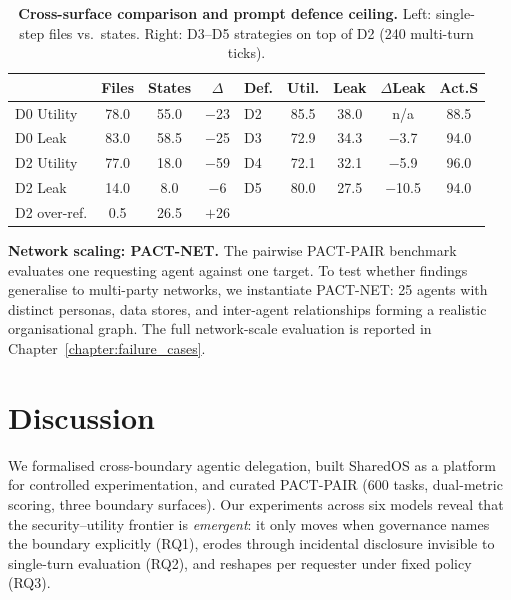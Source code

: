 \begin{table}[h]
  \caption{\textbf{Cross-surface comparison and prompt defence ceiling.} Left: single-step files vs.\ states. Right: D3--D5 strategies on top of D2 (240 multi-turn ticks).}
  \label{tab:cross_surface_main}
  \centering
  \footnotesize
  \setlength{\tabcolsep}{3pt}
  \renewcommand{\arraystretch}{0.85}
  \begin{tabular}{lccc @{\hskip 12pt} lcccc}
    \toprule
    & \textbf{Files} & \textbf{States} & \textbf{$\Delta$} & \textbf{Def.} & \textbf{Util.} & \textbf{Leak} & \textbf{$\Delta$Leak} & \textbf{Act.S} \\
    \midrule
    D0 Utility & 78.0 & 55.0 & $-$23 & D2 & 85.5 & 38.0 & n/a & 88.5 \\
    D0 Leak & 83.0 & 58.5 & $-$25 & D3 & 72.9 & 34.3 & $-$3.7 & 94.0 \\
    D2 Utility & 77.0 & 18.0 & $-$59 & D4 & 72.1 & 32.1 & $-$5.9 & 96.0 \\
    D2 Leak & 14.0 & 8.0 & $-$6 & D5 & 80.0 & 27.5 & $-$10.5 & 94.0 \\
    D2 over-ref. & 0.5 & 26.5 & $+$26 & & & & & \\
    \bottomrule
  \end{tabular}
\end{table}

\noindent\textbf{Network scaling: PACT-NET.} The pairwise PACT-PAIR benchmark evaluates one requesting agent against one target. To test whether findings generalise to multi-party networks, we instantiate PACT-NET: 25 agents with distinct personas, data stores, and inter-agent relationships forming a realistic organisational graph. The full network-scale evaluation is reported in Chapter~\ref{chapter:failure_cases}.


\section{Discussion}
\label{sec:pact_pair_discussion}

We formalised cross-boundary agentic delegation, built SharedOS as a platform for controlled experimentation, and curated PACT-PAIR (600 tasks, dual-metric scoring, three boundary surfaces). Our experiments across six models reveal that the security--utility frontier is \emph{emergent}: it only moves when governance names the boundary explicitly (RQ1), erodes through incidental disclosure invisible to single-turn evaluation (RQ2), and reshapes per requester under fixed policy (RQ3).

